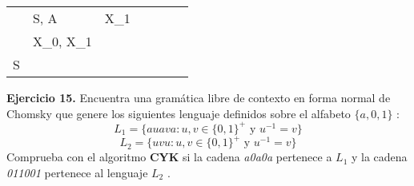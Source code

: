 \documentclass[11pt,a4paper]{article}
\begin{document}
\begin {enumerate}
\begin{table}[h]
\begin{tabular}{lllllll}
		\multicolumn{1}{|l|}{}     & \multicolumn{1}{l|}{S, A}          & \multicolumn{1}{l|}{X\_1}                                                                &                                                                                       &                           &                           &                           \\ \cline{1-3}
		\multicolumn{1}{|l|}{}     & \multicolumn{1}{l|}{X\_0, X\_1}    &                                                                                          &                                                                                       &                           &                           &                           \\ \cline{1-2}
		\multicolumn{1}{|l|}{S}    &                                    &                                                                                          &                                                                                       &                           &                           &                           \\ \cline{1-1}
	\end{tabular}
\end{table}

\end{enumerate}

\textbf{Ejercicio 15.} Encuentra una gramática libre de contexto en forma normal de Chomsky que genere los
siguientes lenguaje definidos sobre el alfabeto $\{a, 0, 1\}$ :
$$L_1 = \{auava : u,v \in \{0, 1\}^+ \text { y } u^{-1} = v\} $$
$$L_2 = \{uvu : u,v \in \{0, 1\}^+ \text{ y } u^{-1} = v\} $$
Comprueba con el algoritmo \textbf{CYK} si la cadena \emph{a0a0a} pertenece a $L_1$ y la cadena \emph{011001} pertenece al lenguaje $L_2$ .
\end{document}
